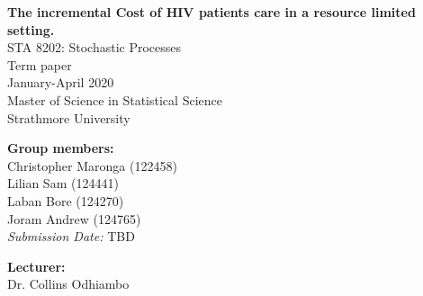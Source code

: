 \documentclass[11pt]{article}
\begin{document}
	\clearpage\thispagestyle{empty}
	
	\begin{center}
		\textbf{\huge{
				The incremental Cost of HIV patients care in a resource limited setting.
		}} \\[1.5cm]
		\Large{
			STA 8202: Stochastic Processes \\
			Term paper \\
			January-April 2020\\[0.5cm]
			Master of Science in Statistical Science\\
			Strathmore University	
		}
	\end{center}
	
	\vspace*{1cm}
	\textbf{\large{Group members:}}\\
	Christopher Maronga (122458) \\
	Lilian Sam (124441) \\
	Laban Bore (124270) \\
	Joram Andrew (124765) \\[0.5cm]
	
	\noindent\textit{Submission Date:} TBD
	
	\vspace*{2.5cm}
	\textbf{\large{Lecturer:}}\\
	Dr. Collins Odhiambo 
	
	
	\newpage \setcounter{page}{1}
	
\end{document}
